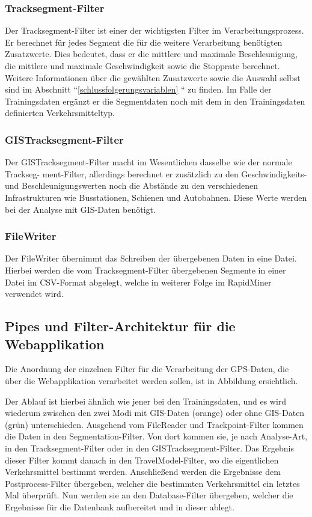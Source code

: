 \subsubsection{Tracksegment-Filter}
\label{tracksegmentFilter}
Der Tracksegment-Filter ist einer der wichtigsten Filter im Verarbeitungsprozess. Er berechnet für jedes Segment die für die weitere Verarbeitung benötigten Zusatzwerte. Dies bedeutet, dass er die mittlere und maximale Beschleunigung, die mittlere und maximale Geschwindigkeit sowie die Stopprate berechnet. Weitere Informationen über die gewählten Zusatzwerte sowie die Auswahl selbst sind im Abschnitt ``\ref{schlussfolgerungsvariablen} `` zu finden.  Im Falle der Trainingsdaten ergänzt er die Segmentdaten noch mit dem in den Trainingsdaten definierten Verkehrsmitteltyp.

\subsubsection{GISTracksegment-Filter}
\label{gisTracksegmentFilter}
Der GISTracksegment-Filter macht im Wesentlichen dasselbe wie der normale Trackseg- ment-Filter, allerdings berechnet er zusätzlich zu den Geschwindigkeits- und Beschleunigungswerten noch die Abstände zu den verschiedenen Infrastrukturen wie Busstationen, Schienen und Autobahnen. Diese Werte werden bei der Analyse mit GIS-Daten benötigt.

\subsubsection{FileWriter}
Der FileWriter übernimmt das Schreiben der übergebenen Daten in eine Datei. Hierbei werden die vom Tracksegment-Filter übergebenen Segmente in einer Datei im CSV-Format abgelegt, welche in weiterer Folge im RapidMiner verwendet wird.

\subsection{Pipes und Filter-Architektur für die Webapplikation}
Die Anordnung der einzelnen Filter für die Verarbeitung der GPS-Daten, die über die Webapplikation verarbeitet werden sollen, ist in Abbildung  ersichtlich. 

Der Ablauf ist hierbei ähnlich wie jener bei den Trainingsdaten, und es wird wiederum zwischen den zwei Modi mit GIS-Daten (orange) oder ohne GIS-Daten (grün) unterschieden. Ausgehend vom FileReader und Trackpoint-Filter kommen die Daten in den Segmentation-Filter. Von dort kommen sie, je nach Analyse-Art, in den Tracksegment-Filter oder in den GISTracksegment-Filter. Das Ergebnis dieser Filter kommt danach in den TravelModel-Filter, wo die eigentlichen Verkehrsmittel bestimmt werden. Anschließend werden die Ergebnisse dem Postprocess-Filter übergeben, welcher die bestimmten Verkehrsmittel ein letztes Mal überprüft. Nun werden sie an den Database-Filter übergeben, welcher die Ergebnisse für die Datenbank aufbereitet und in dieser ablegt.

